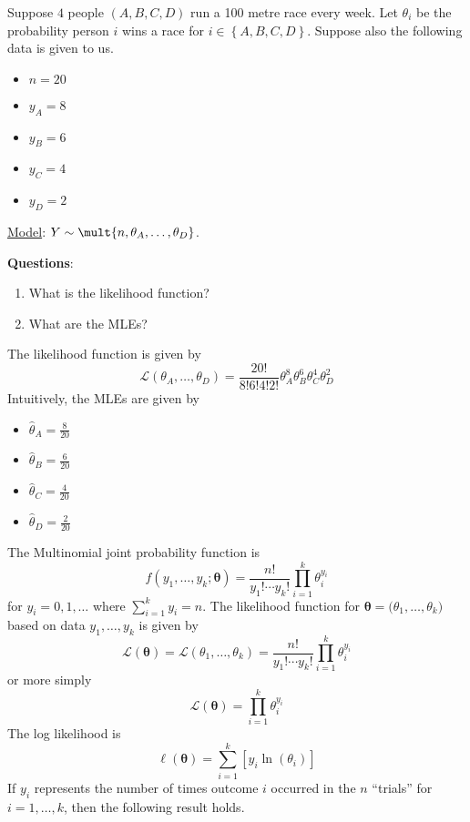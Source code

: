 \begin{Example}{}{}
    Suppose $ 4 $ people $ (A,B,C,D) $ run a 100 metre race every week.
    Let $ \theta_i $ be the probability person $ i $ wins a race for
    $ i\in\left\{ A,B,C,D\right\} $.
    Suppose also the following data is given to us.
    \begin{itemize}
        \item $ n=20 $
        \item $ y_A=8 $
        \item $ y_B=6 $
        \item $ y_C=4 $
        \item $ y_D=2 $
    \end{itemize}
    \underline{Model}: $ Y \sim \mult{n,\theta_A,\ldots ,\theta_D} $.

    \textbf{Questions}:
    \begin{enumerate}[label=(\alph*)]
        \item What is the likelihood function?
        \item What are the MLEs?
    \end{enumerate}
    The likelihood function is given by
    \[ \mathcal{L}(\theta_A,\ldots ,\theta_D)=\frac{20!}{8!6!4!2!} \theta_A^8\theta_B^6\theta_C^4\theta_D^2 \]
    Intuitively, the MLEs are given by
    \begin{itemize}
        \item $ \hat{\theta}_A=\frac{8}{20} $
        \item $ \hat{\theta}_B=\frac{6}{20} $
        \item $ \hat{\theta}_C=\frac{4}{20} $
        \item $ \hat{\theta}_D=\frac{2}{20} $
    \end{itemize}
\end{Example}


The Multinomial joint probability function is
\[ f(y_1,\ldots ,y_k;\symbf{\theta})=\frac{n!}{y_1!\cdots y_k!}\prod_{i=1}^k \theta_i^{y_i} \]
for $ y_i=0,1,\ldots $ where $ \sum\limits_{i=1}^{k} y_i = n $.
The likelihood function for $ \symbf{\theta}=\symbf(\theta_1,\ldots ,\theta_k) $ based on data
$ y_1,\ldots ,y_k $ is given by
\[ \mathcal{L}(\symbf{\theta})=\mathcal{L}(\theta_1,\ldots ,\theta_k)=\frac{n!}{y_1!\cdots y_k!} \prod_{i=1}^k
    \theta_i^{y_i} \]
or more simply
\[ \mathcal{L}(\symbf{\theta})=\prod_{i=1}^k \theta_i^{y_i} \]
The log likelihood is
\[ \ell(\symbf{\theta})=\sum\limits_{i=1}^{k} \left[ y_i\ln(\theta_i) \right] \]
If $ y_i $ represents the number of times outcome $ i $ occurred in the $ n $ ``trials''
for $ i=1,\ldots ,k $, then the following result holds.

